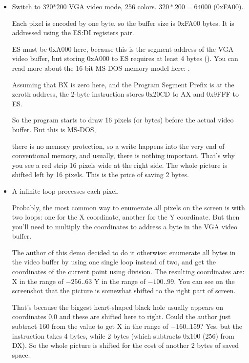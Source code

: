 \begin{itemize}
\item Switch to 320*200 VGA video mode, 256 colors. 
$320*200=64000$ (0xFA00). 

Each pixel is encoded by one byte, so the buffer size is 0xFA00 bytes.
It is addressed using the ES:DI registers pair.

ES must be 0xA000 here, because this is the segment address of 
the VGA video buffer, but storing 0xA000 to ES requires at least 4 bytes (). 
You can read more about the 16-bit MS-DOS memory model here: 
.


Assuming that BX is zero here, and the Program Segment Prefix is at the zeroth
address, the 2-byte  instruction stores 0x20CD to AX and 0x9FFF to ES.

So the program starts to draw 16 pixels (or bytes) before the actual video buffer.
But this is MS-DOS, 

there is no memory protection, so a write happens into the very end of conventional memory, and usually, there is nothing important.
That's why you see a red strip 16 
pixels wide at the right side.
The whole picture is shifted left by 16 pixels.
This is the price of saving 2 bytes.

\item A infinite loop processes each pixel.

Probably, the most common way to enumerate all pixels on the screen is with two loops: 
one for the X coordinate, another for the Y coordinate.
But then you'll need 
to multiply the coordinates to address a byte in the VGA video buffer.

The author of this demo decided to do it otherwise: enumerate all bytes in the video buffer by using one single loop instead 
of two, and get the coordinates of the current point using division.
The resulting coordinates are: X in the range of $-256..63$ \AndENRU Y 
in the range of $-100..99$.
You can see on 
the screenshot that the picture is somewhat shifted to the right part of screen.

That's because the biggest heart-shaped black hole usually appears on coordinates 0,0 and these are shifted
here to right.
Could the author just 
subtract 160 from the value to get X in the range of $-160..159$? 
Yes, but the instruction  takes 4 bytes, 
while \EMDASH{}2 bytes 
(which subtracts 0x100 (256) from DX). 
So the whole picture is shifted for the cost of 
another 2 bytes of saved space.


\end{itemize}
